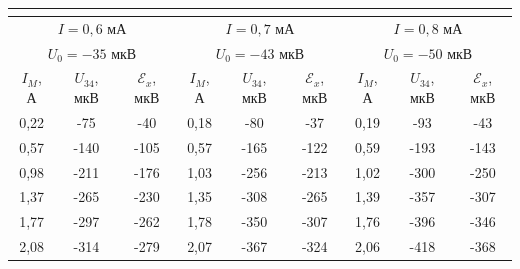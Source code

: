 \documentclass[a4paper, 12pt]{article}
\begin{document}
\begin{table}[H]
\begin{tabular}{ccccccccc}
        \multicolumn{1}{l}{} & \multicolumn{1}{l}{} & \multicolumn{1}{l}{} & \multicolumn{1}{l}{} & \multicolumn{1}{l}{} & \multicolumn{1}{l}{} & \multicolumn{1}{l}{} & \multicolumn{1}{l}{} & \multicolumn{1}{l}{} \\ \hline
        \multicolumn{3}{|c|}{$I = 0,6$ мА} & \multicolumn{3}{c|}{$I = 0,7$ мА} & \multicolumn{3}{c|}{$I = 0,8$ мА} \\ \hline
        \multicolumn{3}{|c|}{$U_0 = -35$ мкВ} & \multicolumn{3}{c|}{$U_0 = -43$ мкВ} & \multicolumn{3}{c|}{$U_0 = -50$ мкВ} \\ \hline
        \multicolumn{1}{|c|}{$I_M$, А} & \multicolumn{1}{c|}{$U_{34}$, мкВ} & \multicolumn{1}{c|}{$\mathcal{E}_x$, мкВ} & \multicolumn{1}{c|}{$I_M$, А} & \multicolumn{1}{c|}{$U_{34}$, мкВ} & \multicolumn{1}{c|}{$\mathcal{E}_x$, мкВ} & \multicolumn{1}{c|}{$I_M$, А} & \multicolumn{1}{c|}{$U_{34}$, мкВ} & \multicolumn{1}{c|}{$\mathcal{E}_x$, мкВ} \\ \hline
        \multicolumn{1}{|c|}{0,22} & \multicolumn{1}{c|}{-75} & \multicolumn{1}{c|}{-40} & \multicolumn{1}{c|}{0,18} & \multicolumn{1}{c|}{-80} & \multicolumn{1}{c|}{-37} & \multicolumn{1}{c|}{0,19} & \multicolumn{1}{c|}{-93} & \multicolumn{1}{c|}{-43} \\ \hline
        \multicolumn{1}{|c|}{0,57} & \multicolumn{1}{c|}{-140} & \multicolumn{1}{c|}{-105} & \multicolumn{1}{c|}{0,57} & \multicolumn{1}{c|}{-165} & \multicolumn{1}{c|}{-122} & \multicolumn{1}{c|}{0,59} & \multicolumn{1}{c|}{-193} & \multicolumn{1}{c|}{-143} \\ \hline
        \multicolumn{1}{|c|}{0,98} & \multicolumn{1}{c|}{-211} & \multicolumn{1}{c|}{-176} & \multicolumn{1}{c|}{1,03} & \multicolumn{1}{c|}{-256} & \multicolumn{1}{c|}{-213} & \multicolumn{1}{c|}{1,02} & \multicolumn{1}{c|}{-300} & \multicolumn{1}{c|}{-250} \\ \hline
        \multicolumn{1}{|c|}{1,37} & \multicolumn{1}{c|}{-265} & \multicolumn{1}{c|}{-230} & \multicolumn{1}{c|}{1,35} & \multicolumn{1}{c|}{-308} & \multicolumn{1}{c|}{-265} & \multicolumn{1}{c|}{1,39} & \multicolumn{1}{c|}{-357} & \multicolumn{1}{c|}{-307} \\ \hline
        \multicolumn{1}{|c|}{1,77} & \multicolumn{1}{c|}{-297} & \multicolumn{1}{c|}{-262} & \multicolumn{1}{c|}{1,78} & \multicolumn{1}{c|}{-350} & \multicolumn{1}{c|}{-307} & \multicolumn{1}{c|}{1,76} & \multicolumn{1}{c|}{-396} & \multicolumn{1}{c|}{-346} \\ \hline
        \multicolumn{1}{|c|}{2,08} & \multicolumn{1}{c|}{-314} & \multicolumn{1}{c|}{-279} & \multicolumn{1}{c|}{2,07} & \multicolumn{1}{c|}{-367} & \multicolumn{1}{c|}{-324} & \multicolumn{1}{c|}{2,06} & \multicolumn{1}{c|}{-418} & \multicolumn{1}{c|}{-368} \\ \hline

\end{tabular}
\end{table}
\end{document}
